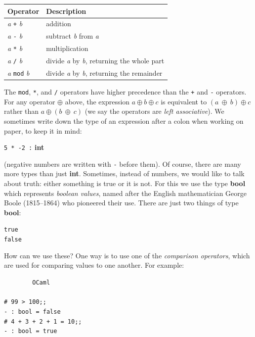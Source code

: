 \documentclass[]{book}
\newcommand{\smspace}{\vspace{4mm}}
\begin{document}
\smspace
\noindent\begin{tabular}{@{}ll@{}} \toprule
Operator & Description\\
\midrule
\index{+@\texttt{+}}\textit{a} \texttt{+} \textit{b} & addition\\
\index{-@\texttt{-}}\textit{a} \texttt{-} \textit{b} & subtract \textit{b} from \textit{a}\\
\index{*@\texttt{*}}\textit{a} \texttt{*} \textit{b} & multiplication\\
\index{/@\texttt{/}}\textit{a} \texttt{/} \textit{b} & divide \textit{a} by \textit{b}, returning the whole part\\
\index{mod@\texttt{mod}}\textit{a} \texttt{mod} \textit{b} & divide \textit{a} by \textit{b}, returning the remainder\\ \bottomrule
\end{tabular}
\smspace

\noindent The \texttt{mod}, \texttt{*}, and \texttt{/} operators have higher precedence than the \texttt{+} and \texttt{-} operators. For any operator $\oplus$ above, the expression $a \oplus b\oplus c$ is equivalent to $(a\ \oplus\ b)\oplus c$ rather than $a \oplus (b\ \oplus\ c)$  (we say the operators are \textit{left associative}). We sometimes write down the type of an expression after a colon when working on paper, to keep it in mind:

\smspace
\texttt{5 * -2 :}\textbf{\textsf{ int}}
\smspace

\noindent (negative numbers are written with \texttt{-} before them). Of course, there are many more types than just \textsf{\textbf{int}}. Sometimes, instead of numbers, we would like to talk about truth: either something is true or it is not. For this we use the type \textsf{\textbf{bool}} which represents \textit{boolean values}, named after the English mathematician George Boole (1815--1864) who pioneered their use. There are just two things of type \textbf{\textsf{bool}}:

\smspace
{}\texttt{true}\\
\indent{}\texttt{false}
\smspace

\noindent How can we use these? One way is to use one of the \textit{comparison operators}, which are used for comparing values to one another. For example:

\smspace
\noindent\verb!        OCaml!\\
\noindent\\
\noindent\verb!# 99 > 100;;!\\
\noindent\verb!- : bool = false!\\
\noindent\verb!# 4 + 3 + 2 + 1 = 10;;!\\
\noindent\verb!- : bool = true!
\smspace
\end{document}
